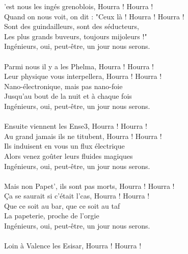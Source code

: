 
'est nous les ingés grenoblois, Hourra ! Hourra !
\\Quand on nous voit, on dit : "Ceux là ! Hourra ! Hourra !
\\Sont des guindailleurs, sont des séducteurs,
\\Les plus grands buveurs, toujours mijoleurs !"
\\Ingénieurs, oui, peut-être, un jour nous serons.
\\\\Parmi nous il y a les Phelma, Hourra ! Hourra !
\\Leur physique vous interpellera, Hourra ! Hourra !
\\Nano-électronique, mais pas nano-foie
\\Jusqu'au bout de la nuit et à chaque fois
\\Ingénieurs, oui, peut-être, un jour nous serons.
\\\\Ensuite viennent les Ense3, Hourra ! Hourra !
\\Au grand jamais ils ne titubent, Hourra ! Hourra !
\\Ils induisent en vous un flux électrique
\\Alors venez goûter leurs fluides magiques
\\Ingénieurs, oui, peut-être, un jour nous serons.
\\\\Mais non Papet', ils sont pas morts, Hourra ! Hourra !
\\Ça se saurait si c'était l'cas, Hourra ! Hourra !
\\Que ce soit au bar, que ce soit au taf
\\La papeterie, proche de l'orgie
\\Ingénieurs, oui, peut-être, un jour nous serons.
\\\\Loin à Valence les Esisar, Hourra ! Hourra !
